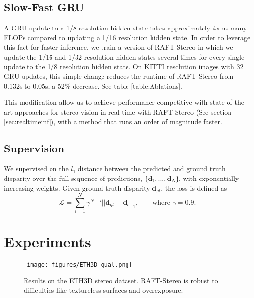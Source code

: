\documentclass[10pt,twocolumn,letterpaper]{article}
\begin{document}
\vspace{-4mm}
\subsection{Slow-Fast GRU}
A GRU-update to a 1/8 resolution hidden state takes approximately 4x as many FLOPs compared to updating a 1/16 resolution hidden state. In order to leverage this fact for faster inference, we train a version of RAFT-Stereo in which we update the 1/16 and 1/32 resolution hidden states several times for every single update to the 1/8 resolution hidden state. On KITTI resolution images with 32 GRU updates, this simple change reduces the runtime of RAFT-Stereo from 0.132s to 0.05s, a 52\% decrease. See table \ref{table:Ablations}.

This modification allow us to achieve performance competitive with state-of-the-art approaches for stereo vision in real-time with RAFT-Stereo (See section \ref{sec:realtimeinf}), with a method that runs an order of magnitude faster.


\subsection{Supervision} 
We supervised on the $l_1$ distance between the predicted and ground truth disparity over the full sequence of predictions, $\{\mathbf{d}_1, ..., \mathbf{d}_N \}$, with exponentially increasing weights. Given ground truth disparity $\mathbf{d}_{gt}$, the loss is defined as
\begin{equation}
    \mathcal{L} = \sum_{i=1}^{N} \gamma^{N-i} ||\mathbf{d}_{gt} - \mathbf{d}_i||_1, \qquad \text{where } \gamma=0.9 .
\end{equation}



\section{Experiments}









\begin{figure*}[h]
\centering
	\texttt{[image: figures/ETH3D\_qual.png]}
	\caption{Results on the ETH3D stereo dataset. RAFT-Stereo is robust to difficulties like textureless surfaces and overexposure.}
	\label{fig:ETHQual}
\end{figure*}
\end{document}
